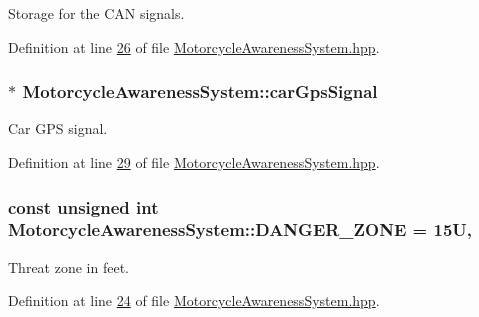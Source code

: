 Storage for the C\-A\-N signals. 



Definition at line \hyperlink{MotorcycleAwarenessSystem_8hpp_source_l00026}{26} of file \hyperlink{MotorcycleAwarenessSystem_8hpp_source}{Motorcycle\-Awareness\-System.\-hpp}.

\hypertarget{classMotorcycleAwarenessSystem_a9a8185e00b60d0be58bfa76166063128}{
\subsubsection[{car\-Gps\-Signal}]{$\ast$ Motorcycle\-Awareness\-System\-::car\-Gps\-Signal\hspace{0.3cm}{\ttfamily [private]}}}\label{classMotorcycleAwarenessSystem_a9a8185e00b60d0be58bfa76166063128}


Car G\-P\-S signal. 



Definition at line \hyperlink{MotorcycleAwarenessSystem_8hpp_source_l00029}{29} of file \hyperlink{MotorcycleAwarenessSystem_8hpp_source}{Motorcycle\-Awareness\-System.\-hpp}.

\hypertarget{classMotorcycleAwarenessSystem_abe0296f34c0ca2857a94659dfdc5801c}{
\subsubsection[{D\-A\-N\-G\-E\-R\-\_\-\-Z\-O\-N\-E}]{\setlength{\rightskip}{0pt plus 5cm}const unsigned int Motorcycle\-Awareness\-System\-::\-D\-A\-N\-G\-E\-R\-\_\-\-Z\-O\-N\-E = 15\-U\hspace{0.3cm}{\ttfamily [static]}, {\ttfamily [private]}}}\label{classMotorcycleAwarenessSystem_abe0296f34c0ca2857a94659dfdc5801c}


Threat zone in feet. 



Definition at line \hyperlink{MotorcycleAwarenessSystem_8hpp_source_l00024}{24} of file \hyperlink{MotorcycleAwarenessSystem_8hpp_source}{Motorcycle\-Awareness\-System.\-hpp}.

